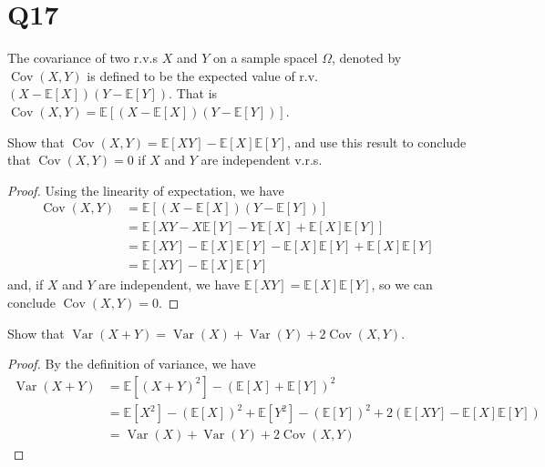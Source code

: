\documentclass[11pt]{article}
\begin{document}
\section*{Q17}
The covariance of two r.v.s $X$ and $Y$ on a sample spacel $\Omega$, denoted by $\operatorname{Cov}(X,Y)$ is defined to be the expected value of 
r.v. $(X-\mathbb{E}\left[ X  \right] )(Y-\mathbb{E}\left[ Y  \right] )$.
That is $\operatorname{Cov}(X,Y)=\mathbb{E}\left[ 
    (X-\mathbb{E}\left[ X  \right] )(Y-\mathbb{E}\left[ Y  \right] )
 \right] $.
\begin{qparts}
    
    \item Show that $\operatorname{Cov}(X,Y)=\mathbb{E}\left[ XY \right]
    -\mathbb{E}\left[ X \right]\mathbb{E}\left[ Y \right]   $, and use this result to conclude that $\operatorname{Cov}(X,Y)=0$ if $X$ and $Y$ are independent v.r.s.
    \begin{proof}
        Using the linearity of expectation, we have 
        \begin{align*}
            \operatorname{Cov}(X,Y)&=\mathbb{E}\left[ 
                (X-\mathbb{E}\left[ X  \right] )(Y-\mathbb{E}\left[ Y  \right] )
                \right]  \\
            &=\mathbb{E}\left[ XY-X\mathbb{E}\left[ Y 
            \right]  -Y\mathbb{E}\left[ X  \right] +\mathbb{E}\left[ X  \right] \mathbb{E}\left[ Y \right] \right] \\
            &=\mathbb{E}\left[ XY  \right] -\mathbb{E}\left[ X \right]\mathbb{E}\left[ Y \right]  
            -\mathbb{E}\left[ X \right]\mathbb{E}\left[ Y \right] 
            +\mathbb{E}\left[ X \right]\mathbb{E}\left[ Y \right]\\
            &= \mathbb{E}\left[ XY \right]
            -\mathbb{E}\left[ X \right]\mathbb{E}\left[ Y \right]
        \end{align*}
        and, if $X$ and $Y$ are independent, we have $\mathbb{E}\left[ XY \right]
            =\mathbb{E}\left[ X \right]\mathbb{E}\left[ Y \right]$, so we 
            can conclude $\operatorname{Cov}(X,Y)=0$.
    \end{proof}
    
    \item Show that $\operatorname{Var}(X+Y)=\operatorname{Var}(X)+\operatorname{Var}(Y)+2\operatorname{Cov}(X,Y)$.
    \begin{proof}
        By the definition of variance, we have 
        \begin{align*}
          \operatorname{Var}(X+Y)&=\mathbb{E}[ 
            \left( X+Y \right)^{2}
           ] -(\mathbb{E}\left[ X \right] +\mathbb{E}\left[ Y \right] )^{2}\\
           &=\mathbb{E}\left[ X^{2} \right]-(\mathbb{E}\left[ X \right] ) ^{2}
           +
           \mathbb{E}\left[ Y^{2} \right]-(\mathbb{E}\left[ Y \right] ) ^{2}+
           2\left( \mathbb{E}\left[ XY \right]
           -\mathbb{E}\left[ X \right]\mathbb{E}\left[ Y \right] \right)\\
           &=\operatorname{Var}(X)+\operatorname{Var}(Y)+2\operatorname{Cov}(X,Y)
        \end{align*}
    \end{proof}


\end{qparts}
\end{document}
